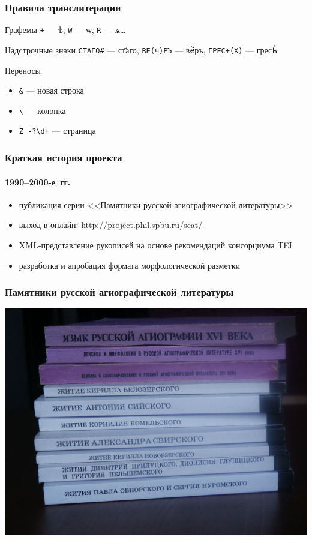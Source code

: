 \documentclass[xetex, aspectratio=169, russian]{beamer}
\begin{document}
\begin{frame}
  \frametitle{Правила транслитерации}

  \begin{block}{Графемы}
    \texttt{+} --- {\agio ѣ}, \texttt{W} --- {\agio ѡ}, \texttt{R} --- {\agio ѧ}\ldots
  \end{block}

  \begin{block}{Надстрочные знаки}
    \texttt{СТАГО\#} --- {\agio ст҃аго}, \texttt{BE(ч)PЪ} --- {\agio ве҇ⷱръ}, \texttt{ГРЕС+(Х)} --- {\agio гресѣⷯ}
  \end{block}

  \begin{block}{Переносы}
    \begin{itemize}
      \item \texttt{\&} --- новая строка
      \item \texttt{\textbackslash} --- колонка
      \item \texttt{Z -?\textbackslash{}d+} --- страница
    \end{itemize}
  \end{block}
\end{frame}

\begin{frame}
  \frametitle{Краткая история проекта}
  \framesubtitle{1990--2000-е~гг.}

  \begin{block}{}
    \begin{itemize}
      \item публикация серии <<Памятники русской агиографической литературы>>\autocite{coll:2012}
      \item выход в онлайн: \url{http://project.phil.spbu.ru/scat/}
      \item XML-представление рукописей на основе рекомендаций консорциума TEI\autocite{alexeev:2009}
      \item \alert{разработка и апробация формата морфологической разметки}\autocite{ivanova:2006}
    \end{itemize}
  \end{block}
\end{frame}

\begin{frame}
  \frametitle{Памятники русской агиографической литературы}

  \begin{center}
    \includegraphics[width=0.7\linewidth]{books}
  \end{center}
\end{frame}
\end{document}
